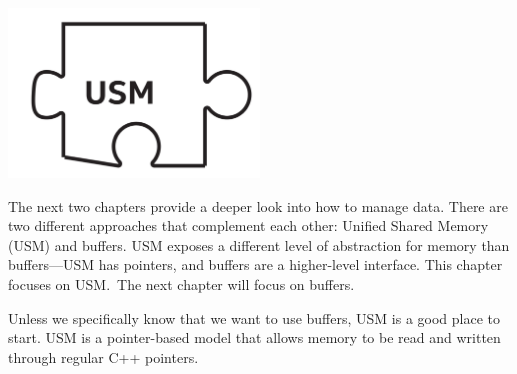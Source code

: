 \begin{center}
	\includegraphics[width=0.5\textwidth]{content/chapter-6/images/1}
\end{center}

The next two chapters provide a deeper look into how to manage data. There are two different approaches that complement each other: Unified Shared Memory (USM) and buffers. USM exposes a different level of abstraction for memory than buffers—USM has pointers, and buffers are a higher-level interface. This chapter focuses on USM. The next chapter will focus on buffers.\par

Unless we specifically know that we want to use buffers, USM is a good place to start. USM is a pointer-based model that allows memory to be read and written through regular C++ pointers.\par